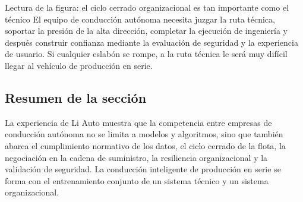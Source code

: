 \begin{knowledgebox}{Lectura de la figura: el ciclo cerrado organizacional es tan importante como el técnico}
El equipo de conducción autónoma necesita juzgar la ruta técnica, soportar la presión de la alta dirección, completar la ejecución de ingeniería y después construir confianza mediante la evaluación de seguridad y la experiencia de usuario. Si cualquier eslabón se rompe, a la ruta técnica le será muy difícil llegar al vehículo de producción en serie.
\end{knowledgebox}

\subsection{Resumen de la sección}

La experiencia de Li Auto muestra que la competencia entre empresas de conducción autónoma no se limita a modelos y algoritmos, sino que también abarca el cumplimiento normativo de los datos, el ciclo cerrado de la flota, la negociación en la cadena de suministro, la resiliencia organizacional y la validación de seguridad. La conducción inteligente de producción en serie se forma con el entrenamiento conjunto de un sistema técnico y un sistema organizacional.
